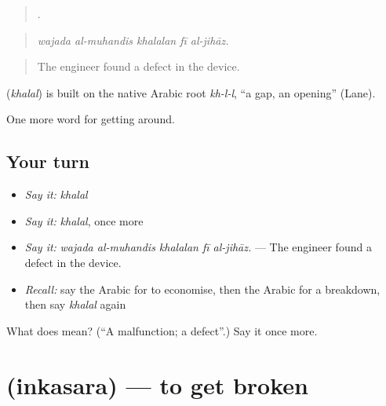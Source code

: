 \begin{quote}
    .
\end{quote}

\begin{quote}
\emph{wajada al-muhandis khalalan fī al-jihāz.}
\end{quote}

\begin{quote}
The engineer found a defect in the device.
\end{quote}

\begin{cousinweb}
\textbf{} (\emph{khalal}) is built on the native Arabic root \emph{kh-l-l}, \textquotedblleft{}a gap, an opening\textquotedblright{} (Lane).
\end{cousinweb}

\begin{grammarlens}[title={What you've built}]
One more word for getting around.
\end{grammarlens}

\subsection*{Your turn}
\begin{itemize}
\raggedright
  \item \emph{Say it:} \emph{khalal}
  \item \emph{Say it:} \emph{khalal}, once more
  \item \emph{Say it:} \emph{wajada al-muhandis khalalan fī al-jihāz.} — The engineer found a defect in the device.
  \item \emph{Recall:} say the Arabic for to economise, then the Arabic for a breakdown, then say \emph{khalal} again
\end{itemize}

\begin{tcolorbox}[breakable,colback=teal!4,colframe=teal!35!black,title={Before you move on}]
What does  mean? (\textquotedblleft{}A malfunction; a defect\textquotedblright{}.) Say it once more.
\end{tcolorbox}
\section[\texorpdfstring{\ar{انكسر} (inkasara)}{انكسر (inkasara)}]{ (inkasara) — to get broken}

\label{lesson:AR-C460-inkasara}



